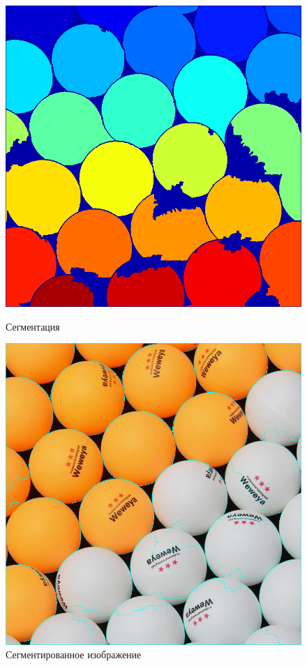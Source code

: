 \newpage
\begin{figure}[!htb]
    \includegraphics[width=\linewidth]{../img/outputs/segmentation_watershed/balls_segmentation.png}
    \caption{Сегментация}
    \endminipage\hfill
    \includegraphics[width=\linewidth]{../img/outputs/segmentation_watershed/balls.png}
    \caption{Сегментированное изображение}
    \endminipage\hfill
\end{figure}

